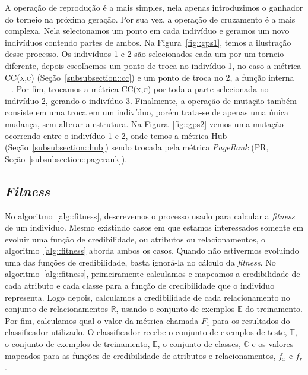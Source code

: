 A operação de reprodução é a mais simples, nela apenas introduzimos o ganhador do torneio na próxima geração. Por sua vez, a operação de cruzamento é a mais complexa. Nela selecionamos um ponto em cada indivíduo e geramos um novo indivíduos contendo partes de ambos. Na Figura~\ref{fig::gps1}, temos a ilustração desse processo. 
Os indivíduos 1 e 2 são selecionados cada um por um torneio diferente, depois escolhemos um ponto de troca no indivíduo 1, no caso a métrica \textsc{CC(x,c)} (Seção~\ref{subsubsection::cc}) e um ponto de troca no 2, a função interna +. Por fim, trocamos a métrica \textsc{CC(x,c)} por toda a parte selecionada no indivíduo 2, gerando o indivíduo 3. Finalmente, a operação de mutação também consiste em uma troca em um indivíduo, porém trata-se de apenas uma única mudança, sem alterar a estrutura. Na Figura~\ref{fig::gps2} vemos uma mutação ocorrendo entre o indivíduo 1 e 2, onde temos a métrica Hub (Seção~\ref{subsubsection::hub}) sendo trocada pela métrica \textit{PageRank} (\textsc{PR}, Seção~\ref{subsubsection::pagerank}).


\subsection{\textit{Fitness}}
\label{subsec::fitness}

No algoritmo~\ref{alg::fitness}, descrevemos o processo usado para calcular a \textit{fitness} de um individuo. 
Mesmo existindo casos em que estamos interessados somente em evoluir uma função de credibilidade, ou atributos ou relacionamentos, o algoritmo~\ref{alg::fitness} aborda ambos os casos. 
Quando não estivermos evoluindo uma das funções de credibilidade, basta ignorá-la no cálculo da \textit{fitness}.
No algoritmo~\ref{alg::fitness}, primeiramente calculamos e mapeamos a credibilidade de cada atributo e cada classe para a função de credibilidade que o individuo representa. Logo depois, calculamos a credibilidade de cada relacionamento no conjunto de relacionamentos $\mathbb{R}$, usando o conjunto de exemplos $\mathbb{E}$ do treinamento.
Por fim, calculamos qual o valor da métrica chamada \textit{$F_1$} para os resultados do classificador utilizado. 
O classificador recebe o conjunto de exemplos de teste, $\mathbb{T}$, o conjunto de exemplos de treinamento, $\mathbb{E}$, o conjunto de classes, $\mathbb{C}$ e os valores mapeados para as funções de credibilidade de atributos e relacionamentos, $f_x$ e $f_r$.

